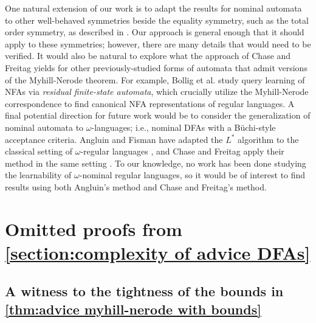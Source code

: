 \documentclass[11pt,a4paper]{amsart}
\theoremstyle{definition}
\newif\ifappendix
\begin{document}
One natural extension of our work is to adapt the results for nominal automata to other well-behaved symmetries beside the equality symmetry, such as the total order symmetry, as described in \cite{bojanczyk-klin-lasota:automata-theory-in-nominal-sets}. 
Our approach is general enough that it should apply to these symmetries; however, there are many details that would need to be verified. 
It would also be natural to explore what the approach of Chase and Freitag yields for other previously-studied forms of automata that admit versions of the Myhill-Nerode theorem. 
For example, Bollig et al. \cite{bollig-etal:learning-NFA} study query learning of NFAs via \textit{residual finite-state automata}, which crucially utilize the Myhill-Nerode correspondence to find canonical NFA representations of regular languages. 
A final potential direction for future work would be to consider the generalization of nominal automata to $\omega$-languages; i.e., nominal DFAs with a B\"uchi-style acceptance criteria. 
Angluin and Fisman have adapted the $L^*$ algorithm to the classical setting of $\omega$-regular languages \cite{angluin-fisman:learning-regular-omega-languages}, and Chase and Freitag apply their method in the same setting \cite{chase-freitag:bounds-in-query-learning}.
To our knowledge, no work has been done studying the learnability of $\omega$-nominal regular languages, so it would be of interest to find results using both Angluin's method and Chase and Freitag's method. 

%




%
%

%

\ifappendix

\newpage
\appendix


\section{Omitted proofs from \autoref{section:complexity of advice DFAs}} \label{appendix:advice DFAs omitted proofs}

\subsection{A witness to the tightness of the bounds in \autoref{thm:advice myhill-nerode with bounds}} \label{appendix:witness to tightness of advice myhill-nerode bounds}
\end{document}

